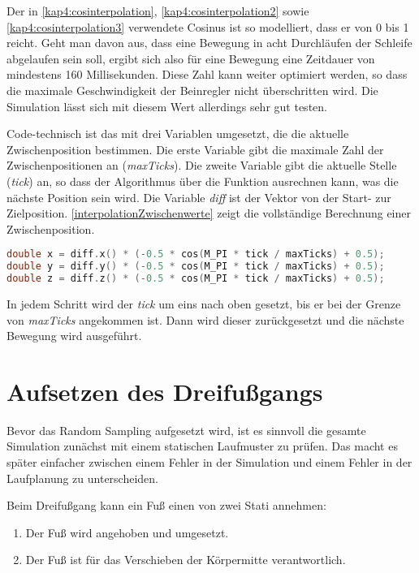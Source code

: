 \begin{itemize}
Der in \autoref{kap4:cosinterpolation}, \autoref{kap4:cosinterpolation2} sowie \autoref{kap4:cosinterpolation3} verwendete Cosinus ist so modelliert, dass er von 0 bis 1 reicht. Geht man davon aus, dass eine Bewegung in acht Durchläufen der Schleife abgelaufen sein soll, ergibt sich also für eine Bewegung eine Zeitdauer von mindestens 160 Millisekunden. Diese Zahl kann weiter optimiert werden, so dass die maximale Geschwindigkeit der Beinregler nicht überschritten wird. Die Simulation lässt sich mit diesem Wert allerdings sehr gut testen.

Code-technisch ist das mit drei Variablen umgesetzt, die die aktuelle Zwischenposition bestimmen. Die erste Variable gibt die maximale Zahl der Zwischenpositionen an (\emph{maxTicks}). Die zweite Variable gibt die aktuelle Stelle (\emph{tick}) an, so dass der Algorithmus über die Funktion ausrechnen kann, was die nächste Position sein wird. Die Variable \emph{diff} ist der Vektor von der Start- zur Zielposition. \autoref{interpolationZwischenwerte} zeigt die vollständige Berechnung einer Zwischenposition.

\begin{lstlisting}[label={interpolationZwischenwerte}, language=C++, caption={Interpolation der Zwischenpositionen}]
double x = diff.x() * (-0.5 * cos(M_PI * tick / maxTicks) + 0.5);
double y = diff.y() * (-0.5 * cos(M_PI * tick / maxTicks) + 0.5);
double z = diff.z() * (-0.5 * cos(M_PI * tick / maxTicks) + 0.5);
\end{lstlisting}

In jedem Schritt wird der \emph{tick} um eins nach oben gesetzt, bis er bei der Grenze von \emph{maxTicks} angekommen ist. Dann wird dieser zurückgesetzt und die nächste Bewegung wird ausgeführt.

\section{Aufsetzen des Dreifußgangs}

Bevor das Random Sampling aufgesetzt wird, ist es sinnvoll die gesamte Simulation zunächst mit einem statischen Laufmuster zu prüfen. Das macht es später einfacher zwischen einem Fehler in der Simulation und einem Fehler in der Laufplanung zu unterscheiden.

Beim Dreifußgang kann ein Fuß einen von zwei Stati annehmen:
\begin{enumerate}
  \item Der Fuß wird angehoben und umgesetzt.
  \item Der Fuß ist für das Verschieben der Körpermitte verantwortlich.
\end{enumerate}


\end{itemize}
